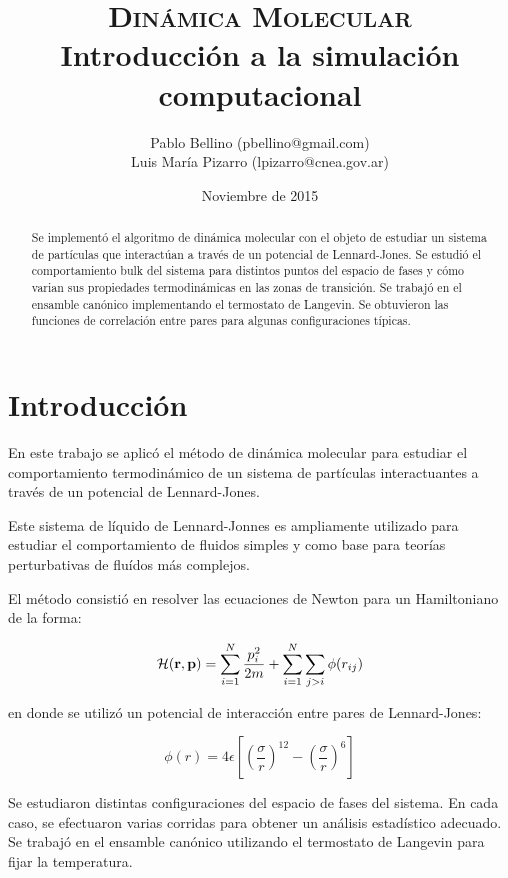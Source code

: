 \documentclass[a4paper,12pt]{article}
\title{\textsc{Dinámica Molecular} \\ \vspace{2em} \Large{Introducción a la 
simulación computacional}}
\author{\small{ Pablo Bellino (pbellino@gmail.com)} \\
        \small{Luis María Pizarro (lpizarro@cnea.gov.ar)}}
\date{Noviembre de 2015}
\begin{document}

\maketitle

\begin{abstract}
Se implementó el algoritmo de dinámica molecular con el objeto de estudiar un 
sistema de partículas que interactúan a través de un potencial de 
Lennard-Jones. Se estudió el comportamiento bulk del sistema para distintos 
puntos del espacio de fases y cómo varian sus propiedades termodinámicas en las 
zonas de transición. Se trabajó en el ensamble canónico implementando 
el termostato de Langevin. Se obtuvieron las funciones de correlación entre 
pares para algunas configuraciones típicas.
\end{abstract}


\section{Introducción}

En este trabajo se aplicó el método de dinámica molecular para estudiar el 
comportamiento termodinámico de un sistema de partículas interactuantes a 
través de un potencial de Lennard-Jones.

Este sistema de líquido de Lennard-Jonnes es ampliamente utilizado para 
estudiar el comportamiento de fluidos simples y como base para teorías 
perturbativas de fluídos más complejos.

El método consistió en resolver las ecuaciones de Newton para un Hamiltoniano 
de la forma:

\begin{equation}\label{eq:hamiltoniano}
  \mathcal H({\bf r},{\bf p}) = \sum_{i=1}^{N} \frac{p_i^2}{2m} + \sum_{i=1}^N \sum_{j>i} \phi (r_{ij})
\end{equation}

\noindent en donde se utilizó un potencial de interacción entre pares de 
Lennard-Jones:

\begin{equation}\label{eq:pot_LJ}
  \phi (r) = 4\epsilon\left[\left(\frac{\sigma}{r}\right)^{12} -\left(\frac{\sigma}{r}\right)^{6}\right]
\end{equation}

Se estudiaron distintas configuraciones del espacio de fases del sistema. En 
cada caso, se efectuaron varias corridas para obtener un análisis estadístico 
adecuado. Se trabajó en el ensamble canónico utilizando el termostato de 
Langevin para fijar la temperatura. 
\end{document}
